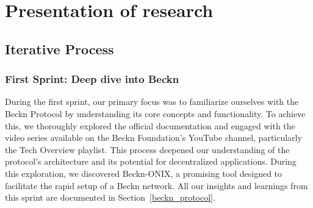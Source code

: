\section{Presentation of research}
\label{presentation_of_research}
\subsection{Iterative Process}


\subsubsection{First Sprint: Deep dive into Beckn}
During the first sprint, our primary focus was to familiarize ourselves with the Beckn Protocol by understanding its core concepts and functionality. To achieve this, we thoroughly explored the official documentation and engaged with the video series available on the Beckn Foundation’s YouTube channel, particularly the Tech Overview playlist. This process deepened our understanding of the protocol’s architecture and its potential for decentralized applications. During this exploration, we discovered Beckn-ONIX, a promising tool designed to facilitate the rapid setup of a Beckn network. All our insights and learnings from this sprint are documented in Section~\ref{beckn_protocol}.

